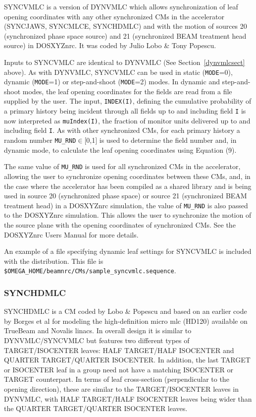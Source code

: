 \documentclass[12pt,twoside]{article}
\begin{document}
SYNCVMLC is a version of DYNVMLC which allows synchronization of leaf opening
coordinates with any other synchronized CMs in the accelerator (SYNCJAWS, SYNCMLCE,
SYNCHDMLC) and with the motion of sources 20 (synchronized phase space source) and
21 (synchronized BEAM treatment head source) in DOSXYZnrc.  It was coded by Julio Lobo \&
Tony Popescu\cite{LP10}.

Inputs to SYNCVMLC are identical to DYNVMLC (See Section~\ref{dynvmlcsect} above).
As with DYNVMLC, SYNCVMLC can be used in static ({\tt MODE}=0), dynamic ({\tt MODE}=1)
or step-and-shoot ({\tt MODE}=2) modes.  In dynamic and step-and-shoot modes, the leaf
opening coordinates for the fields are read from a file supplied by the user.  The
input, {\tt INDEX(I)}, defining the cumulative probability of a primary history
being incident through all fields up to and including field {\tt I} is now interpreted as {\tt muIndex(I)}, the
fraction of monitor units delivered up to and including field {\tt I}.  As with other
synchronized CMs, for each primary history a random number {\tt MU\_RND}$\in[$0,1$]$ is
used to determine the field number and, in dynamic mode, to calculate the leaf
opening coordinates using Equation (9).

The same value of {\tt MU\_RND} is used for all synchronized CMs in the accelerator, allowing
the user to synchronize opening coordinates between these CMs, and, in the case where the
accelerator has been compiled as a shared library and is being used in source 20 (synchronized
phase space) or source 21 (synchronized BEAM treatment head) in a DOSXYZnrc simulation, the
value of {\tt MU\_RND} is also passed to the DOSXYZnrc simulation.  This allows the user
to synchronize the motion of the source plane with the opening coordinates of synchronized
CMs.  See the DOSXYZnrc Users Manual\cite{Wa05} for more details.

An example of a file specifying dynamic leaf settings for SYNCVMLC
is included with the distribution.  This file is {\tt \$OMEGA\_HOME/beamnrc/CMs/sample\_syncvmlc.sequence}.

\clearpage
\renewcommand{\rightmark}{SYNCHDMLC CM}
\subsubsection{SYNCHDMLC}
\label{synchdmlcsect}

SYNCHDMLC is a CM coded by Lobo \& Popescu and based on an earlier code by Borges et al\cite{Bo12} for
modeling the high-definition micro mlc (HD120) available on TrueBeam and Novalis linacs.  In overall
design it is similar to DYNVMLC/SYNCVMLC but features two different types of TARGET/ISOCENTER leaves:
HALF TARGET/HALF ISOCENTER and QUARTER TARGET/QUARTER ISOCENTER.  In addition, the last TARGET or ISOCENTER
leaf in a group need not have a matching ISOCENTER or TARGET counterpart.  In terms of leaf cross-section
(perpendicular to the opening direction), these are
similar to the TARGET/ISOCENTER leaves in DYNVMLC, with HALF TARGET/HALF ISOCENTER leaves being
wider than the QUARTER TARGET/QUARTER ISOCENTER leaves.
\end{document}
